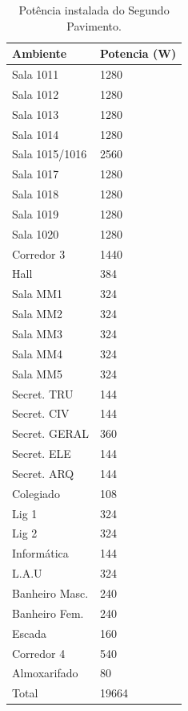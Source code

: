 \begin{table}[H]
\centering
\caption{Potência instalada do Segundo Pavimento.}
\label{tab_pav1}
\begin{tabular}{ll}\hline
Ambiente       & Potencia (W) \\\hline
Sala 1011      & 1280         \\
Sala 1012      & 1280         \\
Sala 1013      & 1280         \\
Sala 1014      & 1280         \\
Sala 1015/1016 & 2560         \\
Sala 1017      & 1280         \\
Sala 1018      & 1280         \\
Sala 1019      & 1280         \\
Sala 1020      & 1280         \\
Corredor 3     & 1440         \\
Hall           & 384          \\
Sala MM1       & 324          \\
Sala MM2       & 324          \\
Sala MM3       & 324          \\
Sala MM4       & 324          \\
Sala MM5       & 324          \\
Secret. TRU    & 144          \\
Secret. CIV    & 144          \\
Secret. GERAL  & 360          \\
Secret. ELE    & 144          \\
Secret. ARQ    & 144          \\
Colegiado      & 108          \\
Lig 1          & 324          \\
Lig 2          & 324          \\
Informática    & 144          \\
L.A.U          & 324          \\
Banheiro Masc. & 240          \\
Banheiro Fem.  & 240          \\
Escada         & 160          \\
Corredor 4     & 540          \\
Almoxarifado   & 80           \\\hline
Total          & 19664  \\\hline       
\end{tabular}
\end{table}


